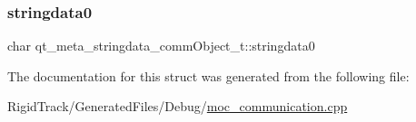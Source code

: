 \subsubsection{\texorpdfstring{stringdata0}{stringdata0}}
{\footnotesize\ttfamily char qt\+\_\+meta\+\_\+stringdata\+\_\+comm\+Object\+\_\+t\+::stringdata0}



The documentation for this struct was generated from the following file\+:\begin{DoxyCompactItemize}
\item 
Rigid\+Track/\+Generated\+Files/\+Debug/\hyperlink{_debug_2moc__communication_8cpp}{moc\+\_\+communication.\+cpp}\end{DoxyCompactItemize}
